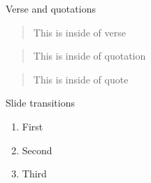 \begin{frame}{Verse and quotations}
  \begin{verse}
    This is inside of verse
  \end{verse}
  \begin{quotation}
    This is inside of quotation
  \end{quotation}
  \begin{quote}
    This is inside of quote
  \end{quote}
\end{frame}


\begin{frame}{Slide transitions}
  \begin{enumerate}
    \item<1,2> First
    \item<2> Second
    \item<3> Third
  \end{enumerate}
\end{frame}




